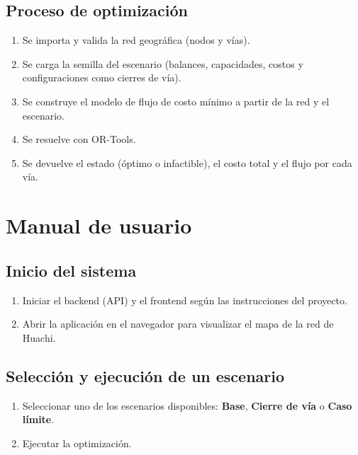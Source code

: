\documentclass{article}
\begin{document}
\subsection{Proceso de optimización}
\begin{enumerate}
    \item Se importa y valida la red geográfica (nodos y vías).
    \item Se carga la semilla del escenario (balances, capacidades, costos y
          configuraciones como cierres de vía).
    \item Se construye el modelo de flujo de costo mínimo a partir de la red y
          el escenario.
    \item Se resuelve con OR-Tools.
    \item Se devuelve el estado (óptimo o infactible), el costo total y el
          flujo por cada vía.
\end{enumerate}

\section{Manual de usuario}

\subsection{Inicio del sistema}
\begin{enumerate}
    \item Iniciar el backend (API) y el frontend según las instrucciones del
          proyecto.
    \item Abrir la aplicación en el navegador para visualizar el mapa de la red
          de Huachi.
\end{enumerate}

\subsection{Selección y ejecución de un escenario}
\begin{enumerate}
    \item Seleccionar uno de los escenarios disponibles: \textbf{Base},
          \textbf{Cierre de vía} o \textbf{Caso límite}.
    \item Ejecutar la optimización.
\end{enumerate}
\end{document}
